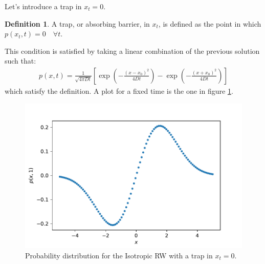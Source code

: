 \documentclass[4apaper,11pt,fleqn]{article}
\theoremstyle{remark}
\theoremstyle{definition}
\newtheorem*{dfn}{Definition}
\begin{document}
Let's introduce a trap in $x_t = 0$.
\begin{dfn}
  A trap, or absorbing barrier, in $x_t$, is defined as the point in which $p(x_t,t)=0 \quad \forall t$.
\end{dfn}
This condition is satisfied by taking a linear combination of the previous solution such that:
\begin{align}
  \label{eq:sol_trap}
  p(x, t)=\frac{1}{\sqrt{4 \pi D t}}\left[\exp \left(-\frac{\left(x-x_{0}\right)^{2}}{4 D t}\right)-\exp \left(-\frac{\left(x+x_{0}\right)^{2}}{4 D t}\right)\right]
\end{align}
which satisfy the definition. A plot for a fixed time is the one in figure \ref{fig:rwiso}.
\begin{figure}
  \includegraphics[width=\textwidth]{plot_iso_RW.pdf}
  \caption{Probability distribution for the Isotropic RW with a trap in $x_t=0$.}
  \label{fig:rwiso}
\end{figure}
\end{document}
